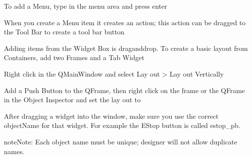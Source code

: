 \documentclass[letterpaper,10pt,english]{sphinxmanual}
\begin{document}
\sphinxAtStartPar
To add a Menu, type in the menu area and press enter


\sphinxAtStartPar
When you create a Menu item it creates an action; this action can be dragged to
the Tool Bar to create a tool bar button


\sphinxAtStartPar
Adding items from the Widget Box is drag\sphinxhyphen{}and\sphinxhyphen{}drop. To create a basic layout from
Containers, add two Frames and a Tab Widget


\sphinxAtStartPar
Right click in the QMainWindow and select Lay out \textendash{}\textgreater{} Lay out Vertically



\sphinxAtStartPar
Add a Push Button to the QFrame, then right click on the frame or the QFrame in
the Object Inspector and set the lay out to 



\sphinxAtStartPar
After dragging a widget into the window, make sure you use the correct
objectName for that widget. For example the E\sphinxhyphen{}Stop button is called estop\_pb.

\begin{sphinxadmonition}{note}{Note:}
\sphinxAtStartPar
Each object name must be unique; designer will not allow duplicate
names.
\end{sphinxadmonition}
\end{document}
